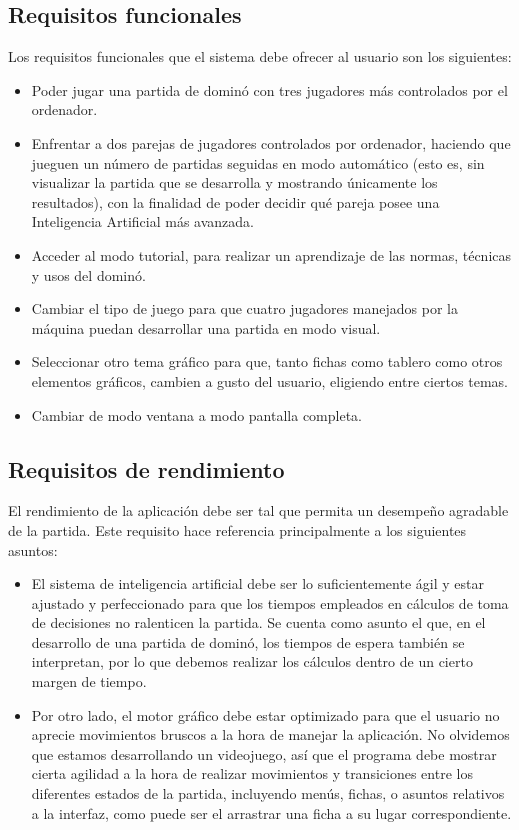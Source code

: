\subsection{Requisitos funcionales}

Los requisitos funcionales que el sistema debe ofrecer al usuario son los siguientes:
\begin{itemize}
    \item Poder jugar una partida de dominó con tres jugadores más controlados por el ordenador.
    \item Enfrentar a dos parejas de jugadores controlados por ordenador, haciendo que jueguen un número
            de partidas seguidas en modo automático (esto es, sin visualizar la partida que se desarrolla y
            mostrando únicamente los resultados), con la finalidad de poder decidir qué pareja posee una
            Inteligencia Artificial más avanzada.
    \item Acceder al modo tutorial, para realizar un aprendizaje de las normas, técnicas y usos del dominó.
    \item Cambiar el tipo de juego para que cuatro jugadores manejados por la máquina puedan desarrollar una
            partida en modo visual.
    \item Seleccionar otro tema gráfico para que, tanto fichas como tablero como otros elementos gráficos, cambien
            a gusto del usuario, eligiendo entre ciertos temas.
    \item Cambiar de modo ventana a modo pantalla completa.
\end{itemize}


\subsection{Requisitos de rendimiento}

El rendimiento de la aplicación debe ser tal que permita un desempeño agradable de la partida. Este requisito
hace referencia principalmente a los siguientes asuntos:
\begin{itemize}
    \item El sistema de inteligencia artificial debe ser lo suficientemente ágil y estar ajustado y
            perfeccionado para que los tiempos empleados en cálculos de toma de decisiones no ralenticen
            la partida. Se cuenta como asunto el que, en el desarrollo de una partida de dominó, los tiempos de
            espera también se interpretan, por lo que debemos realizar los cálculos dentro de un cierto
            margen de tiempo.
    \item Por otro lado, el motor gráfico debe estar optimizado para que el usuario no aprecie movimientos
            bruscos a la hora de manejar la aplicación. No olvidemos que estamos desarrollando un videojuego,
            así que el programa debe mostrar cierta agilidad a la hora de realizar movimientos y transiciones
            entre los diferentes estados de la partida, incluyendo menús, fichas, o asuntos relativos a la
            interfaz, como puede ser el arrastrar una ficha a su lugar correspondiente.
\end{itemize}

